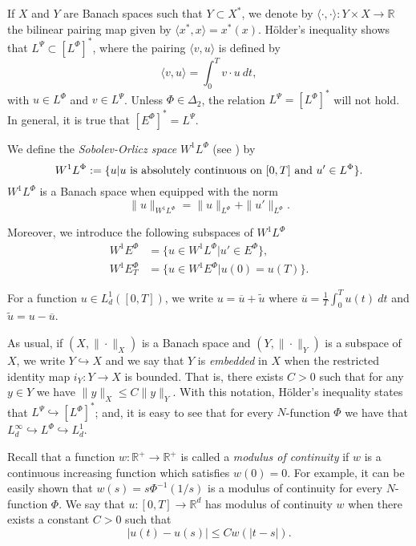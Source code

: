 \documentclass[twoside]{article}
\theoremstyle{remark}
\newcommand{\orlnor}{\|_{L^{\Phi}}}
\newcommand{\lphi}{L^{\Phi}}
\newcommand{\lpsi}{L^{\Psi}}
\newcommand{\ephi}{E^{\Phi}}
\newcommand{\wphi}{W^{1}\lphi}
\newcommand{\wphie}{W^{1}\ephi}
\newcommand{\rr}{\mathbb{R}}
\renewcommand{\leq}{\leqslant}
\newcounter{example}
\begin{document}
If $X$ and $Y$ are  Banach spaces such that  $Y\subset X^*$, we denote by $\langle\cdot,\cdot\rangle:Y\times X\to\mathbb{R}$ the bilinear pairing  map given by $\langle x^*,x\rangle=x^*(x)$. H\"older's inequality shows that $\lpsi\subset \left[\lphi\right]^*$, where the pairing
$\langle v, u\rangle$
is defined by 
\begin{equation}\label{pairing}
  \langle v,u\rangle=\int_0^Tv\cdot u\ dt,
\end{equation}
with  $u\in\lphi$ and $v\in\lpsi$.
 Unless $\Phi \in \Delta_2$, the relation $\lpsi= \left[\lphi\right]^*$ will not hold. In general, it is true  that  $\left[\ephi\right]^*=\lpsi$.



We define the \emph{Sobolev-Orlicz space} $\wphi$ (see \cite{adams_sobolev}) by
\[\wphi:=\{u| u \hbox{ is absolutely continuous on $[0,T]$ and } u'\in \lphi\}.\]
$\wphi$ is a Banach space when equipped with the norm
\begin{equation}\label{def-norma-orlicz-sob}
\|  u  \|_{\wphi}= \|  u  \|_{\lphi} + \|u'\orlnor.
\end{equation}

Moreover, we introduce the following subspaces of $\wphi$
\begin{equation}\label{def-esp-orlicz-sob-per}
\begin{split}
\wphie&=\{u\in\wphi|u'\in\ephi\},\\
\wphie_T&=\{u\in\wphie|u(0)=u(T)\}.
\end{split}
\end{equation}



For a  function $u\in L^1_d([0,T])$, we write $u=\overline{u}+\widetilde{u}$ where $\overline{u} =\frac1T\int_0^T u(t)\ dt$ and $\widetilde{u}=u-\overline{u}$.

As usual, if $(X,\|\cdot\|_X)$ is a Banach space and $(Y,\|\cdot \|_Y)$ is a subspace of $X$,  we write $Y\hookrightarrow X$ and we say that $Y$ is \emph{embedded} in $X$  when the restricted identity map $i_Y:Y\to X$ is bounded. That is, there exists $C>0$ such that  for any $y\in Y$ we have $\|y\|_X\leq C\|y\|_Y$.  With this notation, H\"older's inequality states that  $\lpsi\hookrightarrow  \left[\lphi\right]^*$; and, it is easy to see that for every $N$-function $\Phi$ we have that $L^{\infty}_d\hookrightarrow\lphi \hookrightarrow L^1_d$.


 Recall that a function   $w:\mathbb{R}^+\to \mathbb{R}^+$ is called  a \emph{modulus of continuity} if $w$ is a continuous increasing function which satisfies $w(0)=0$. For example, it can be easily shown that $w(s)=s\Phi^{-1}(1/s)$ is a modulus of  continuity for every $N$-function $\Phi$.  We say that $u:[0,T]\to\rr^d$  has modulus of continuity $w$  when there exists a constant $C>0$ such that
\begin{equation}\label{w-holder}|u(t)-u(s)|\leq Cw(|t-s|).
\end{equation}
\end{document}
